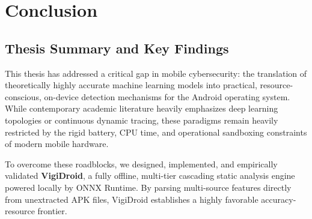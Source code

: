 \chapter{Conclusion}\label{Conclusion}

\section{ Thesis Summary and Key Findings}

This thesis has addressed a critical gap in mobile cybersecurity: the translation of theoretically highly accurate machine learning models into practical, resource-conscious, on-device detection mechanisms for the Android operating system. While contemporary academic literature heavily emphasizes deep learning topologies or continuous dynamic tracing, these paradigms remain heavily restricted by the rigid battery, CPU time, and operational sandboxing constraints of modern mobile hardware.

To overcome these roadblocks, we designed, implemented, and empirically validated \textbf{VigiDroid}, a fully offline, multi-tier cascading static analysis engine powered locally by ONNX Runtime. By parsing multi-source features directly from unextracted APK files, VigiDroid establishes a highly favorable accuracy-resource frontier.

